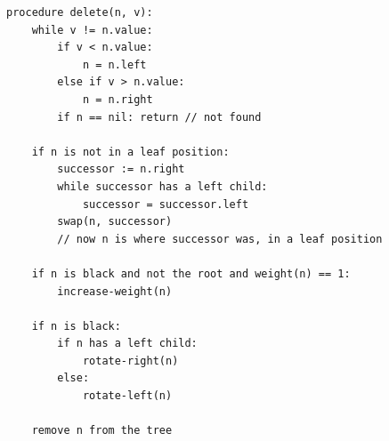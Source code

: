 \documentclass{article}
\begin{document}
\begin{small}
\begin{verbatim}
procedure delete(n, v):
    while v != n.value:
        if v < n.value:
            n = n.left
        else if v > n.value:
            n = n.right
        if n == nil: return // not found

    if n is not in a leaf position:
        successor := n.right
        while successor has a left child:
            successor = successor.left
        swap(n, successor)
        // now n is where successor was, in a leaf position

    if n is black and not the root and weight(n) == 1:
        increase-weight(n)

    if n is black:
        if n has a left child:
            rotate-right(n)
        else:
            rotate-left(n)

    remove n from the tree

\end{verbatim}
\end{small}
\end{document}
